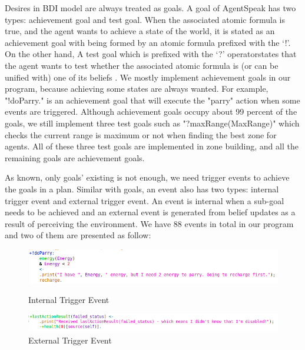 Desires in BDI model are always treated as goals. A goal of AgentSpeak has two types: achievement goal and test goal. When the associated atomic formula is true, and the agent wants to achieve a state of the world, it is stated as an achievement goal with being formed by an atomic formula prefixed with the ‘!’. On the other hand, A test goal which is prefixed with the ‘?’ operatorstates that the agent wants to test whether the associated atomic formula is (or can be unified with) one of its beliefs \cite{rafael_BDIAgent_2005}. We mostly implement achievement goals in our program, because achieving some states are always wanted. For example, "!doParry." is an achievement goal that will execute the "parry" action when some events are triggered. Although achievement goals occupy about 99 percent of the goals, we still implement three test goals such as "?maxRange(MaxRange)" which checks the current range is maximum or not when finding the best zone for agents. All of these three test goals are implemented in zone building, and all the remaining goals are achievement goals.

As known, only goals' existing is not enough, we need trigger events to achieve the goals in a plan. Similar with goals, an event also has two types: internal trigger event and external trigger event. An event is internal when a sub-goal needs to be achieved and an external event is generated from belief updates as a result of perceiving the environment. We have 88 events in total in our program and two of them are presented as follow:
\begin{figure}
\centering%
\begin{minipage}[!htbp]{\linewidth}
\includegraphics[width=5.0in]{images/BDI_trigger_event_Inter}
\caption{Internal Trigger Event}
\label{fig:latticen}
\end{minipage}
\begin{minipage}[!htbp]{\linewidth}
\includegraphics[width=5.0in]{images/BDI_trigger_event_Exter}
\caption{External Trigger Event}
\label{fig:baselinex}
\end{minipage}
\end{figure}

